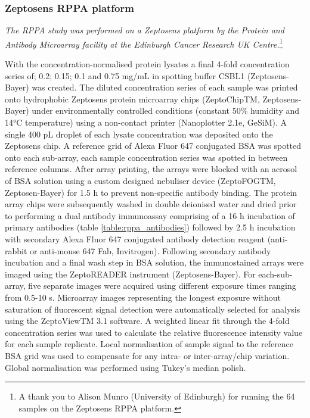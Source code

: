 \documentclass[a4paper,11pt,twoside,openright]{scrbook}
\begin{document}
\subsubsection{Zeptosens RPPA platform}

\textit{The RPPA study was performed on a Zeptosens platform by the Protein and Antibody Microarray facility at the 
Edinburgh Cancer Research UK Centre.}\footnote{A thank you to Alison Munro (University of Edinburgh) for running the 64 
samples on the Zeptosens RPPA platform.}

With the concentration-normalised protein lysates a final 4-fold concentration series of; 0.2; 0.15; 0.1 and 0.75 mg/mL 
in spotting buffer CSBL1 (Zeptosens-Bayer) was created.
The diluted concentration series of each sample was printed onto hydrophobic Zeptosens protein microarray chips 
(ZeptoChipTM, Zeptosens-Bayer) under environmentally controlled conditions (constant 50\% humidity and 14°C 
temperature) using a non-contact printer (Nanoplotter 2.1e, GeSiM).
A single 400 pL droplet of each lysate concentration was deposited onto the Zeptosens chip.
A reference grid of Alexa Fluor 647 conjugated BSA was spotted onto each sub-array, each sample concentration series 
was spotted in between reference columns.
After array printing, the arrays were blocked with an aerosol of BSA solution using a custom designed nebuliser device 
(ZeptoFOGTM, Zeptosen-Bayer) for 1.5 h to prevent non-specific antibody binding.
The protein array chips were subsequently washed in double deionised water and dried prior to performing a dual 
antibody immunoassay comprising of a 16 h incubation of primary antibodies (table \ref{table:rppa_antibodies}) followed 
by 2.5 h incubation with secondary Alexa Fluor 647 conjugated antibody detection reagent (anti-rabbit or anti-mouse 647 
Fab, Invitrogen).
Following secondary antibody incubation and a final wash step in BSA solution, the immunostained arrays were imaged 
using the ZeptoREADER instrument (Zeptosens-Bayer).
For each-sub-array, five separate images were acquired using different exposure times ranging from 0.5-10 s.
Microarray images representing the longest exposure without saturation of fluorescent signal detection were 
automatically selected for analysis using the ZeptoViewTM 3.1 software.
A weighted linear fit through the 4-fold concentration series was used to calculate the relative fluorescence intensity 
value for each sample replicate.
Local normalisation of sample signal to the reference BSA grid was used to compensate for any intra- or 
inter-array/chip variation.
Global normalisation was performed using Tukey's median polish.
\end{document}
